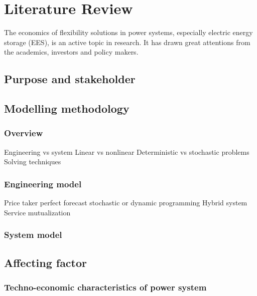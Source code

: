 \chapter{Literature Review}



The economics of flexibility solutions in power systems, especially electric energy storage (EES), is an active topic in research. It has drawn great attentions from the academics, investors and policy makers. 


\section{Purpose and stakeholder}

\section{Modelling methodology}
\subsection{Overview}
Engineering vs system
Linear vs nonlinear
Deterministic vs stochastic problems
Solving techniques

\subsection{Engineering model}
Price taker
perfect forecast
stochastic or dynamic programming
Hybrid system
Service mutualization

\subsection{System model}


\section{Affecting factor}
\subsection{Techno-economic characteristics of power system}
